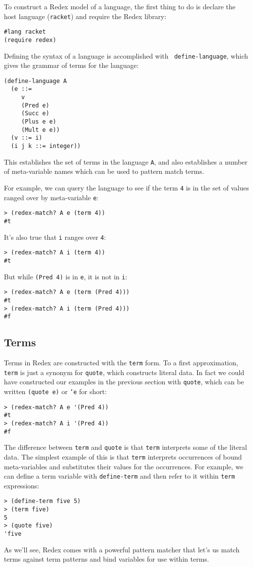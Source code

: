 To construct a Redex model of a language, the first thing to do is
declare the host language ({\tt racket}) and require the Redex
library:
\begin{verbatim}
#lang racket
(require redex)
\end{verbatim}

Defining the syntax of a language is accomplished with {\tt
  define-language}, which gives the grammar of terms for the language:
\begin{verbatim}
(define-language A
  (e ::=
     v
     (Pred e)
     (Succ e)
     (Plus e e)
     (Mult e e))
  (v ::= i)
  (i j k ::= integer))
\end{verbatim}
This establishes the set of terms in the language {\tt A}, and also
establishes a number of meta-variable names which can be used to
pattern match terms.

For example, we can query the language to see if the term {\tt 4} is
in the set of values ranged over by meta-variable {\tt e}:
\begin{verbatim}
> (redex-match? A e (term 4))
#t
\end{verbatim}
It's also true that {\tt i} ranges over {\tt 4}:
\begin{verbatim}
> (redex-match? A i (term 4))
#t
\end{verbatim}
But while {\tt (Pred 4)} is in {\tt e}, it is not in {\tt i}:
\begin{verbatim}
> (redex-match? A e (term (Pred 4)))
#t
> (redex-match? A i (term (Pred 4)))
#f
\end{verbatim}

\subsection{Terms}

Terms in Redex are constructed with the {\tt term} form.  To a first
approximation, {\tt term} is just a synonym for {\tt quote}, which
constructs literal data.  In fact we could have constructed our
examples in the previous section with {\tt quote}, which can be written
{\tt (quote e)} or {\tt 'e} for short:
\begin{verbatim}
> (redex-match? A e '(Pred 4))
#t
> (redex-match? A i '(Pred 4))
#f
\end{verbatim}

The difference between {\tt term} and {\tt quote} is that {\tt term}
interprets some of the literal data.  The simplest example of this is
that {\tt term} interprets occurrences of bound meta-variables and
substitutes their values for the occurrences.  For example, we can
define a term variable with {\tt define-term} and then refer to it
within {\tt term} expressions:
\begin{verbatim}
> (define-term five 5)
> (term five)
5
> (quote five)
'five
\end{verbatim}
As we'll see, Redex comes with a powerful pattern matcher that let's
us match terms against term patterns and bind variables for use within
terms.


